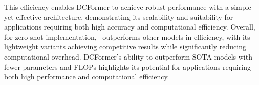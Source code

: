This efficiency enables DCFormer to achieve robust performance with a simple yet effective architecture, demonstrating its scalability and suitability for applications requiring both high accuracy and computational efficiency. Overall, for zero-shot implementation, \dc\ outperforms other models in efficiency, with its lightweight variants achieving competitive results while significantly reducing computational overhead. DCFormer’s ability to outperform SOTA models with fewer parameters and FLOPs highlights its potential for applications requiring both high performance and computational efficiency.




